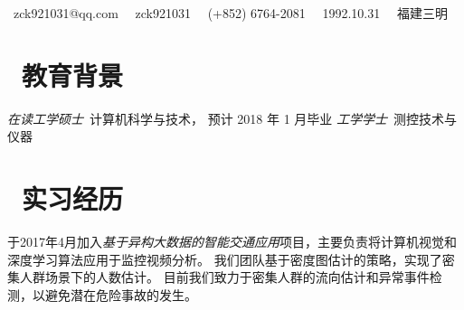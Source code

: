 \documentclass{resume}
\begin{document}

\centerline{\sffamily\large{\faEnvelope\ {zck921031@qq.com} \ \faWeixin\ zck921031 \ \faPhone\ {(+852) 6764-2081} \ \faBirthdayCake\ {1992.10.31} \ \faHome\ {福建三明}} \vspace{1.0ex}}
 
\section{\faGraduationCap\  教育背景}
\textit{在读工学硕士}\ 计算机科学与技术， 预计 2018 年 1 月毕业
\textit{工学学士}\ 测控技术与仪器

\section{\faUsers\ 实习经历}
于2017年4月加入\textsl{基于异构大数据的智能交通应用}项目，主要负责将计算机视觉和深度学习算法应用于监控视频分析。
我们团队基于密度图估计的策略，实现了密集人群场景下的人数估计。
目前我们致力于密集人群的流向估计和异常事件检测，以避免潜在危险事故的发生。
\end{document}
